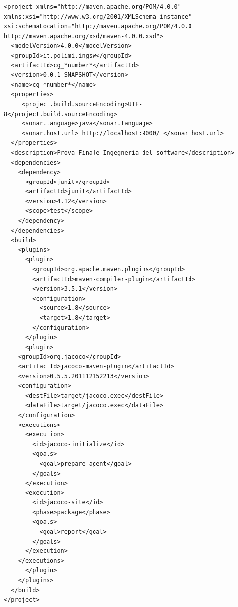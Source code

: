 \documentclass{article}
\begin{document}
\begin{lstlisting}
<project xmlns="http://maven.apache.org/POM/4.0.0" xmlns:xsi="http://www.w3.org/2001/XMLSchema-instance" xsi:schemaLocation="http://maven.apache.org/POM/4.0.0 http://maven.apache.org/xsd/maven-4.0.0.xsd">
  <modelVersion>4.0.0</modelVersion>
  <groupId>it.polimi.ingsw</groupId> 
  <artifactId>cg_*number*</artifactId> 
  <version>0.0.1-SNAPSHOT</version>
  <name>cg_*number*</name>
  <properties>
     <project.build.sourceEncoding>UTF-8</project.build.sourceEncoding>
     <sonar.language>java</sonar.language>
     <sonar.host.url> http://localhost:9000/ </sonar.host.url>
  </properties>
  <description>Prova Finale Ingegneria del software</description>
  <dependencies>
    <dependency>
      <groupId>junit</groupId>
      <artifactId>junit</artifactId>
      <version>4.12</version>
      <scope>test</scope>
    </dependency>
  </dependencies>
  <build>
    <plugins>
      <plugin>
        <groupId>org.apache.maven.plugins</groupId>
        <artifactId>maven-compiler-plugin</artifactId>
        <version>3.5.1</version>
        <configuration>
          <source>1.8</source>
          <target>1.8</target>
        </configuration>
      </plugin>
      <plugin>
	<groupId>org.jacoco</groupId>
	<artifactId>jacoco-maven-plugin</artifactId>
	<version>0.5.5.201112152213</version>
	<configuration>
	  <destFile>target/jacoco.exec</destFile>
	  <dataFile>target/jacoco.exec</dataFile>
	</configuration>
	<executions>
	  <execution>
	    <id>jacoco-initialize</id>
	    <goals>
	      <goal>prepare-agent</goal>
	    </goals>
	  </execution>
	  <execution>
	    <id>jacoco-site</id>
	    <phase>package</phase>
	    <goals>
	      <goal>report</goal>
	    </goals>
	  </execution>
	</executions>
      </plugin>
    </plugins>
  </build>
</project>
\end{lstlisting}

\fi
\end{document}
